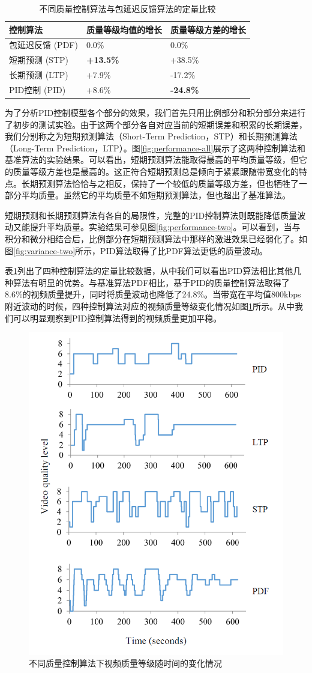 \begin{table}[ht]
	\centering
	\caption{不同质量控制算法与包延迟反馈算法的定量比较}
	\label{tab:improvement}
	\begin{tabular}[b]{p{4.2cm}<{\centering}|p{4.2cm}<{\centering}|p{4.2cm}<{\centering}}
		\hline \hline
		控制算法 & 质量等级均值的增长 & 质量等级方差的增长 \\ \hline
		包延迟反馈 (PDF) & 0.0\% & 0.0\% \\ \hline
		短期预测 (STP) & \textbf{+13.5\%} & +38.5\% \\ \hline
		长期预测 (LTP) & +7.9\% & -17.2\% \\ \hline
		PID控制 (PID) & +8.6\% & \textbf{-24.8\%} \\ \hline
	\end{tabular}
\end{table}

为了分析PID控制模型各个部分的效果，我们首先只用比例部分和积分部分来进行了初步的测试实验。由于这两个部分各自对应当前的短期误差和积累的长期误差，我们分别称之为短期预测算法（Short-Term Prediction，STP）和长期预测算法（Long-Term Prediction，LTP）。图\ref{fig:performance-all}展示了这两种控制算法和基准算法的实验结果。可以看出，短期预测算法能取得最高的平均质量等级，但它的质量等级方差也是最高的。这正符合短期预测总是倾向于紧紧跟随带宽变化的特点。长期预测算法恰恰与之相反，保持了一个较低的质量等级方差，但也牺牲了一部分平均质量。虽然它的平均质量不如短期预测算法，但也超出了基准算法。

短期预测和长期预测算法有各自的局限性，完整的PID控制算法则既能降低质量波动又能提升平均质量。实验结果可参见图\ref{fig:performance-two}。可以看到，当与积分和微分相结合后，比例部分在短期预测算法中那样的激进效果已经弱化了。如图\ref{fig:variance-two}所示，PID算法取得了比PDF算法更低的质量波动。

表\ref{tab:improvement}列出了四种控制算法的定量比较数据，从中我们可以看出PID算法相比其他几种算法有明显的优势。与基准算法PDF相比，基于PID的质量控制算法取得了8.6\%的视频质量提升，同时将质量波动也降低了24.8\%。当带宽在平均值800kbps附近波动的时候，四种控制算法对应的视频质量等级变化情况如图\ref{fig:fluctuation}所示。从中我们可以明显观察到PID控制算法得到的视频质量更加平稳。

\begin{figure}[t]
\centering
\includegraphics[width = 0.45\linewidth]{figures/Fluctuation.png}
\caption{不同质量控制算法下视频质量等级随时间的变化情况 \label{fig:fluctuation}}
\end{figure}


